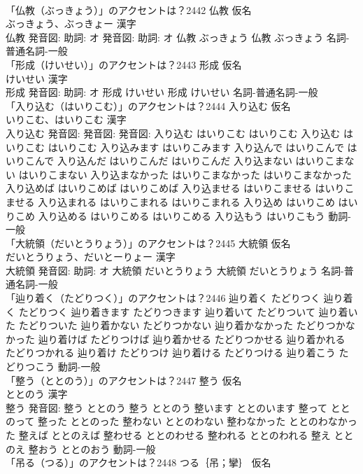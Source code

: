 \documentclass[8pt]{extreport}
\begin{document}
\begin{CJK}{UTF8}{min}
\\	「仏教（ぶっきょう）」のアクセントは？2442	仏教 仮名　
\\	ぶっきょう、ぶっきょー 漢字　
\\	仏教 発音図: 助詞: オ 発音図: 助詞: オ	仏教 ぶっきょう		仏教 ぶっきょう				名詞-普通名詞-一般 
\\	「形成（けいせい）」のアクセントは？2443	形成 仮名　
\\	けいせい 漢字　
\\	形成 発音図: 助詞: オ	形成 けいせい		形成 けいせい				名詞-普通名詞-一般 
\\	「入り込む（はいりこむ）」のアクセントは？2444	入り込む 仮名　
\\	いりこむ、はいりこむ 漢字　
\\	入り込む 発音図: 発音図: 発音図:	入り込む はいりこむ はいりこむ		入り込む はいりこむ はいりこむ 入り込みます はいりこみます 入り込んで はいりこんで はいりこんで 入り込んだ はいりこんだ はいりこんだ 入り込まない はいりこまない はいりこまない 入り込まなかった はいりこまなかった はいりこまなかった 入り込めば はいりこめば はいりこめば 入り込ませる はいりこませる はいりこませる 入り込まれる はいりこまれる はいりこまれる 入り込め はいりこめ はいりこめ 入り込める はいりこめる はいりこめる 入り込もう はいりこもう				動詞-一般 
\\	「大統領（だいとうりょう）」のアクセントは？2445	大統領 仮名　
\\	だいとうりょう、だいとーりょー 漢字　
\\	大統領 発音図: 助詞: オ	大統領 だいとうりょう		大統領 だいとうりょう				名詞-普通名詞-一般 
\\	「辿り着く（たどりつく）」のアクセントは？2446		辿り着く たどりつく		辿り着く たどりつく 辿り着きます たどりつきます 辿り着いて たどりついて 辿り着いた たどりついた 辿り着かない たどりつかない 辿り着かなかった たどりつかなかった 辿り着けば たどりつけば 辿り着かせる たどりつかせる 辿り着かれる たどりつかれる 辿り着け たどりつけ 辿り着ける たどりつける 辿り着こう たどりつこう				動詞-一般 
\\	「整う（ととのう）」のアクセントは？2447	整う 仮名　
\\	ととのう 漢字　
\\	整う 発音図:	整う ととのう		整う ととのう 整います ととのいます 整って ととのって 整った ととのった 整わない ととのわない 整わなかった ととのわなかった 整えば ととのえば 整わせる ととのわせる 整われる ととのわれる 整え ととのえ 整おう ととのおう				動詞-一般 
\\	「吊る（つる）」のアクセントは？2448	つる｛吊；攣｝ 仮名　

\end{CJK}
\end{document}
